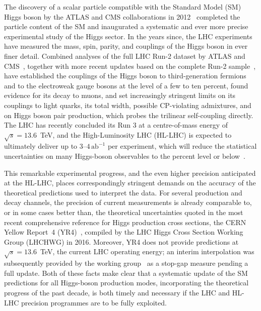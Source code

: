 \renewcommand*{\thefootnote}{\arabic{footnote}}
\setcounter{footnote}{0} \setcounter{page}{1}
The discovery of a scalar particle compatible with the Standard Model
(SM) Higgs boson by the ATLAS and CMS collaborations in
2012~\cite{ATLAS:2012yve,CMS:2012qbp} completed the particle content
of the SM and inaugurated a systematic and ever more precise
experimental study of the Higgs sector. In the years since, the LHC
experiments have measured the mass, spin, parity, and couplings of the
Higgs boson in ever finer detail. Combined analyses of the full LHC
Run-2 dataset by ATLAS and CMS~\cite{ATLAS:2022vkf,CMS:2022dwd},
together with more recent updates based on the complete Run-2
sample~\cite{ATLAS:2026comb,CMS:2026nce}, have established the
couplings of the Higgs boson to third-generation fermions and to the
electroweak gauge bosons at the level of a few to ten percent,
found evidence for its decay to muons, and set increasingly stringent limits on
its couplings to light quarks, its total width, possible CP-violating
admixtures, and on Higgs boson pair production, which probes the
trilinear self-coupling directly.  The LHC has recently concluded its Run 3
at a centre-of-mass energy of $\sqrt{s}=13.6$~TeV, and the
High-Luminosity LHC (HL-LHC) is expected to ultimately deliver up to
$3$--$4\,\mathrm{ab}^{-1}$ per experiment, which will reduce
the statistical uncertainties on many Higgs-boson observables to the
percent level or below~\cite{Cepeda:2019klc}.

This remarkable experimental progress, and the even higher precision
anticipated at the HL-LHC, places correspondingly stringent demands on
the accuracy of the theoretical predictions used to interpret the
data. For several production and decay channels, the precision of
current measurements is already comparable to, or in some cases better
than, the theoretical uncertainties quoted in the most recent
comprehensive reference for Higgs production cross sections, the CERN
Yellow Report~4 (YR4)~\cite{LHCHiggsCrossSectionWorkingGroup:2016ypw},
compiled by the LHC Higgs Cross Section Working Group (LHCHWG) in
2016. Moreover, YR4 does not provide predictions at
$\sqrt{s}=13.6$~TeV, the current LHC operating energy; an interim
interpolation was subsequently provided by the working
group~\cite{Karlberg:2024zxx} as a stop-gap measure pending a full
update. Both of these facts make clear that a systematic update of the
SM predictions for all Higgs-boson production modes, incorporating the
theoretical progress of the past decade, is both timely and necessary
if the LHC and HL-LHC precision programmes are to be fully exploited.

